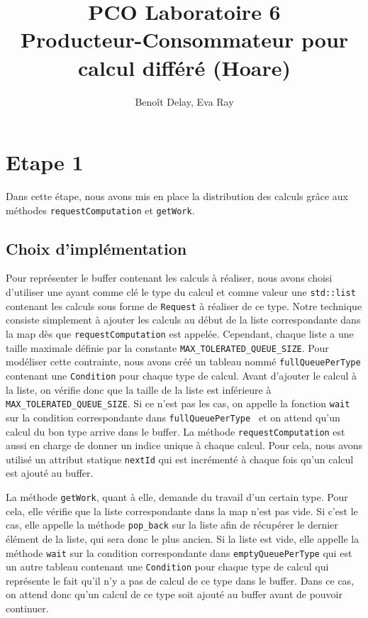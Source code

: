 \documentclass{article}
\title{PCO Laboratoire 6 \\
\large Producteur-Consommateur pour calcul différé (Hoare)}
\author{Benoît Delay, Eva Ray}
\begin{document}
\maketitle

\section{Etape 1}
Dans cette étape, nous avons mis en place la distribution des calculs grâce aux méthodes \texttt{requestComputation} et
\texttt{getWork}.

\subsection{Choix d'implémentation}
Pour représenter le buffer contenant les calculs à réaliser, nous avons choisi d'utiliser une  ayant
comme clé le type du calcul et comme valeur une \texttt{std::list} contenant les calculs sous forme de \texttt{Request} à réaliser de
ce type.
Notre
technique consiste simplement à ajouter les calculs au début de la liste correspondante dans la map dès que
\texttt{requestComputation} est appelée.
Cependant, chaque liste a une taille maximale définie par la constante \texttt{MAX\_TOLERATED\_QUEUE\_SIZE}. Pour
modéliser cette contrainte, nous avons créé un tableau nommé \texttt{fullQueuePerType} contenant une \texttt{Condition}
pour chaque type de calcul.
Avant d'ajouter le calcul à la liste, on vérifie donc que la taille de la liste est inférieure à \texttt{MAX\_TOLERATED\_QUEUE\_SIZE}.
Si ce n'est pas les cas, on appelle la fonction \texttt{wait} sur la condition correspondante dans \texttt{fullQueuePerType
} et on attend qu'un calcul du bon type arrive dans le buffer.
La méthode \texttt{requestComputation} est aussi en charge de donner un indice unique à chaque calcul. Pour cela,
nous avons utilisé un attribut statique \texttt{nextId} qui est incrémenté à chaque fois qu'un calcul est ajouté au
buffer.

La méthode \texttt{getWork}, quant à elle, demande du travail d'un certain type. Pour cela, elle vérifie que la liste
correspondante dans la map n'est pas vide. Si c'est le cas, elle appelle la méthode \texttt{pop\_back} sur la liste
afin de récupérer le dernier élément de la liste, qui sera donc le plus ancien. Si la liste est vide, elle appelle la
méthode \texttt{wait} sur la condition correspondante dans \texttt{emptyQueuePerType} qui est un autre tableau
contenant une \texttt{Condition} pour chaque type de calcul qui représente le fait qu'il n'y a pas de calcul de ce
type dans le buffer. Dans ce cas, on attend donc qu'un calcul de ce type soit ajouté au buffer avant de pouvoir
continuer.
\end{document}
